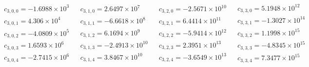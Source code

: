 \documentclass[prd,aps,twocolumn,nofootinbib,showpacs,superscriptaddress]{revtex4-1}
\begin{document}
\[
\begin{array}{cccc}
\begin{array}{c}
 c_{3,0,0}=-1.6988\times 10^3 \\
 c_{3,0,1}=4.306\times 10^4 \\
 c_{3,0,2}=-4.0809\times 10^5 \\
 c_{3,0,3}=1.6593\times 10^6 \\
 c_{3,0,4}=-2.7415\times 10^6 \\
\end{array}
 & 
\begin{array}{c}
 c_{3,1,0}=2.6497\times 10^7 \\
 c_{3,1,1}=-6.6618\times 10^8 \\
 c_{3,1,2}=6.1694\times 10^9 \\
 c_{3,1,3}=-2.4913\times 10^{10} \\
 c_{3,1,4}=3.8467\times 10^{10} \\
\end{array}
 & 
\begin{array}{c}
 c_{3,2,0}=-2.5671\times 10^{10} \\
 c_{3,2,1}=6.4414\times 10^{11} \\
 c_{3,2,2}=-5.9414\times 10^{12} \\
 c_{3,2,3}=2.3951\times 10^{13} \\
 c_{3,2,4}=-3.6549\times 10^{13} \\
\end{array}
 & 
\begin{array}{c}
 c_{3,3,0}=5.1948\times 10^{12} \\
 c_{3,3,1}=-1.3027\times 10^{14} \\
 c_{3,3,2}=1.1998\times 10^{15} \\
 c_{3,3,3}=-4.8345\times 10^{15} \\
 c_{3,3,4}=7.3477\times 10^{15} \\
\end{array}
 \\
 

\end{array}\]
\end{document}
